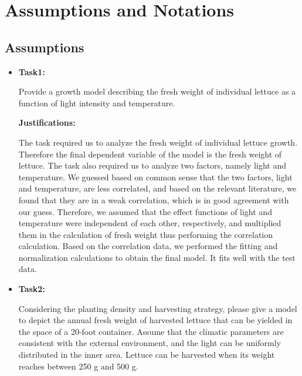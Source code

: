 \section{Assumptions and Notations}

\subsection{Assumptions}

\begin{itemize}
    \item \textbf{Task1: }
    
    Provide a growth model describing the fresh weight of individual lettuce as a function of light intensity and temperature.
  
    \textbf{Justifications:}
    
    \begin{comment}
        任务要求我们分析单个生菜的生长鲜重。因此模型的最终因变量为生菜的鲜重。同时该任务要求我们分析两个因素，分别为光照和温度。我们根据常识猜测，光照与温度两个因素相关性较小，而根据相关文献，我们发现两者处于弱相关，这与我们的猜想符合的很好。因此我们分别假设光照和温度的影响函数相互独立，并在计算鲜重时将其相乘从而进行相关性计算。根据相关数据，我们进行了拟合和归一化计算，得到了最终模型。和测试数据符合的很好。
    \end{comment}

    The task required us to analyze the fresh weight of individual lettuce growth. Therefore the final dependent variable of the model is the fresh weight of lettuce. The task also required us to analyze two factors, namely light and temperature. We guessed based on common sense that the two factors, light and temperature, are less correlated, and based on the relevant literature, we found that they are in a weak correlation, which is in good agreement with our guess. Therefore, we assumed that the effect functions of light and temperature were independent of each other, respectively, and multiplied them in the calculation of fresh weight thus performing the correlation calculation. Based on the correlation data, we performed the fitting and normalization calculations to obtain the final model. It fits well with the test data.
    
    \item \textbf{Task2: }
    
    Considering the planting density and harvesting strategy, please give a model to depict the annual fresh weight of harvested lettuce that can be yielded in the space of a 20-foot container. Assume that the climatic parameters are consistent with the external environment, and the light can be uniformly distributed in the inner area. Lettuce can be harvested when its weight reaches between 250 g and 500 g.
  

\end{itemize}
